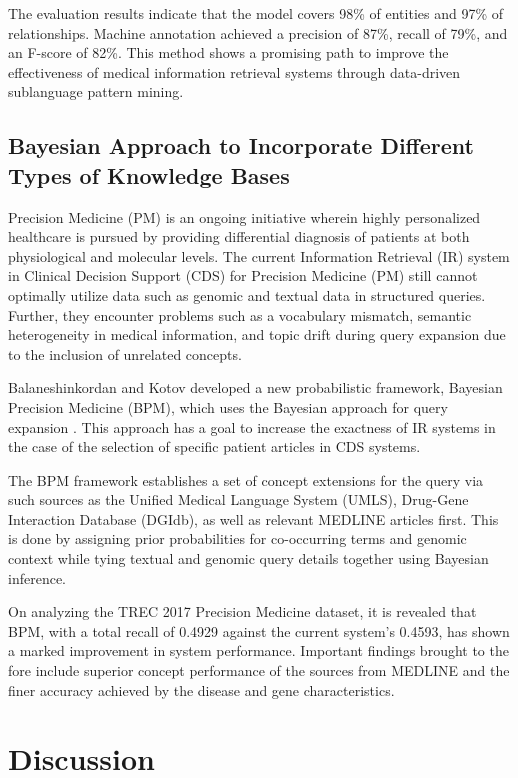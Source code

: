 \documentclass[conference]{IEEEtran}
\begin{document}
The evaluation results indicate that the model covers 98\% of entities and 97\% of relationships. Machine annotation achieved a precision of 87\%, recall of 79\%, and an F-score of 82\%. This method shows a promising path to improve the effectiveness of medical information retrieval systems through data-driven sublanguage pattern mining.

\subsection{Bayesian Approach to Incorporate Different Types of Knowledge Bases}

Precision Medicine (PM) \cite{Collins2015} is an ongoing initiative wherein highly personalized healthcare is pursued by providing differential diagnosis of patients at both physiological and molecular levels. The current Information Retrieval (IR) system in Clinical Decision Support (CDS) for Precision Medicine (PM) still cannot optimally utilize data such as genomic and textual data in structured queries. Further, they encounter problems such as a vocabulary mismatch, semantic heterogeneity in medical information, and topic drift during query expansion due to the inclusion of unrelated concepts.

Balaneshinkordan and Kotov developed a new probabilistic framework, Bayesian Precision Medicine (BPM), which uses the Bayesian approach for query expansion \cite{Balaneshinkordan2019}. This approach has a goal to increase the exactness of IR systems in the case of the selection of specific patient articles in CDS systems.

The BPM framework establishes a set of concept extensions for the query via such sources as the Unified Medical Language System (UMLS), Drug-Gene Interaction Database (DGIdb), as well as relevant MEDLINE articles first. This is done by assigning prior probabilities for co-occurring terms and genomic context while tying textual and genomic query details together using Bayesian inference.

On analyzing the TREC 2017 Precision Medicine dataset, it is revealed that BPM, with a total recall of 0.4929 against the current system's 0.4593, has shown a marked improvement in system performance. Important findings brought to the fore include superior concept performance of the sources from MEDLINE and the finer accuracy achieved by the disease and gene characteristics.

\section{Discussion}
\end{document}
